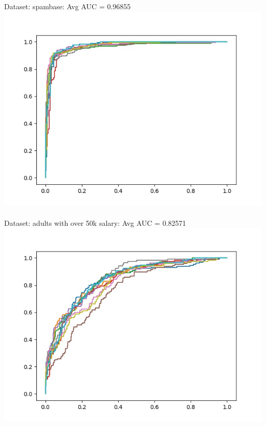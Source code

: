 \documentclass[twoside]{article}
\begin{document}
Dataset: spambase: Avg AUC = 0.96855\\
\includegraphics[scale=0.4]{Plots/Spambase.jpg}
\\\\
Dataset: adults with over 50k salary: Avg AUC = 0.82571\\
\includegraphics[scale=0.4]{Plots/Adult.jpg}
\end{document}
